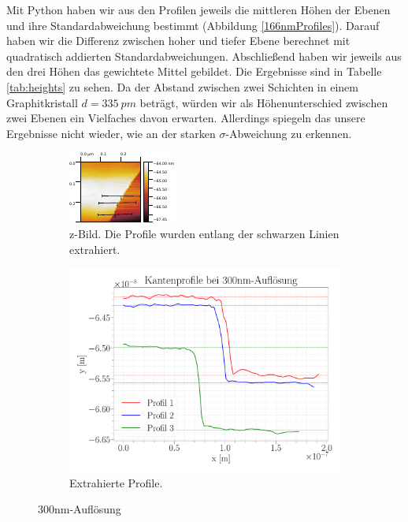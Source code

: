 Mit Python haben wir aus den Profilen jeweils die mittleren Höhen der Ebenen und ihre Standardabweichung bestimmt (Abbildung \ref{166nmProfiles}). Darauf haben wir die Differenz zwischen hoher und tiefer Ebene berechnet mit quadratisch addierten Standardabweichungen. Abschließend haben wir jeweils aus den drei Höhen das gewichtete Mittel gebildet. Die Ergebnisse sind in Tabelle \ref{tab:heights} zu sehen. Da der Abstand zwischen zwei Schichten in einem Graphitkristall $d = \SI{335}{pm}$ beträgt, würden wir als Höhenunterschied zwischen zwei Ebenen ein Vielfaches davon erwarten. Allerdings spiegeln das unsere Ergebnisse nicht wieder, wie an der starken $\sigma$-Abweichung zu erkennen.

\begin{figure}[H]
	\centering
	\begin{subfigure}{0.49\textwidth}
		\centering
\includegraphics[width=\textwidth]{../Gwyddion/HOPG/300nm.pdf}
\caption{z-Bild. Die Profile wurden entlang der schwarzen Linien extrahiert.}
\label{300nm}
	\end{subfigure}
	\begin{subfigure}{0.5\textwidth}
		\centering
\includegraphics[width=\textwidth]{../Figures/300nm_profiles.pdf}
\caption{Extrahierte Profile.}
\label{300nmProfiles}
	\end{subfigure}
	
	\caption{{300}{nm}-Auflösung}
\end{figure}


